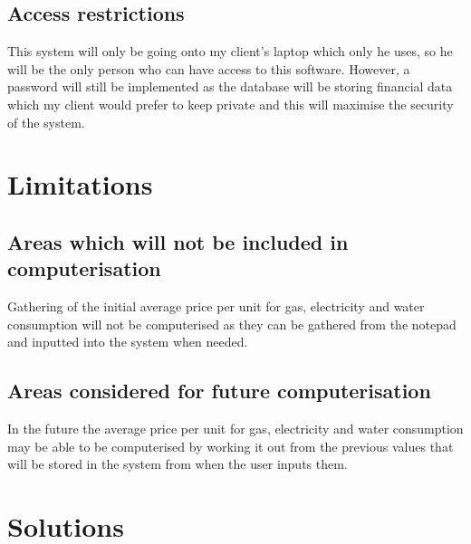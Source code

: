 \subsection{Access restrictions}
This system will only be going onto my client's laptop which only he uses, so he will be the only person who can have access to this software. However, a password will still be implemented as the database will be storing financial data which my client would prefer to keep private and this will maximise the security of the system.
\section{Limitations}

\subsection{Areas which will not be included in computerisation}
Gathering of the initial average price per unit for gas, electricity and water consumption will not be computerised as they can be gathered from the notepad and inputted into the system when needed.
\subsection{Areas considered for future computerisation}
In the future the average price per unit for gas, electricity and water consumption may be able to be computerised by working it out from the previous values that will be stored in the system from when the user inputs them.
\section{Solutions}

